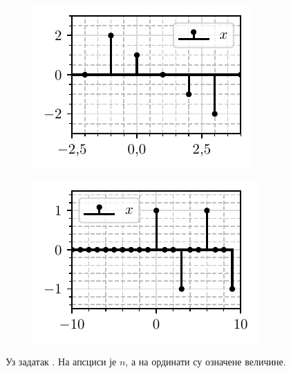 \begin{figure}[ht!]
    \hspace*{0pt}\hfill
    \begin{subfigure}[c]{0.45\textwidth}
        \centering
        \includegraphics[scale=1]{fig/crtaj_dt_v.pdf}
        \caption{}
    \end{subfigure}
    \hspace*{0pt}\hfill
    \begin{subfigure}[c]{0.45\textwidth}
        \centering
        \includegraphics[scale=1]{fig/crtaj_dt_d.pdf}
        \caption{}
    \end{subfigure}
    \hfill
    \hspace*{0pt}
    \caption{Уз задатак \ID. На апсциси је $n$, а на ординати су означене величине.}
\end{figure}